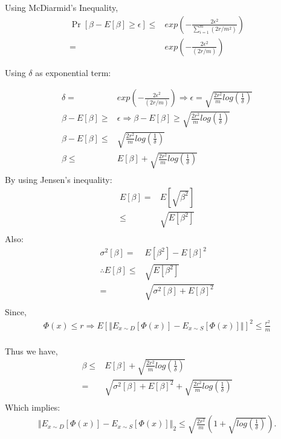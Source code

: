 \documentclass{article}
\begin{document}
\begin{description}
    Using McDiarmid's Inequality,
    \begin{align*}
      \Pr\left[\beta-E[\beta]\geq\epsilon\right] \leq & exp\left(-\frac{2\epsilon^{2}}{\sum_{i=1}^{m}\left(2r/m^{2}\right)}\right) \\
      = & exp\left(-\frac{2\epsilon^{2}}{\left(2r/m\right)}\right)
    \end{align*}

    Using $ \delta $ as exponential term:

    \begin{align*}
      \delta= & exp\left(-\frac{2\epsilon^{2}}{\left(2r/m\right)}\right)\Rightarrow\epsilon=\sqrt{\frac{2r^{2}}{m}log\left(\frac{1}{\delta}\right)}\\
      \beta-E[\beta] \geq & \epsilon\Rightarrow\beta-E[\beta]\geq\sqrt{\frac{2r^{2}}{m}log\left(\frac{1}{\delta}\right)} \\
      \beta-E[\beta] \leq & \sqrt{\frac{2r^{2}}{m}log\left(\frac{1}{\delta}\right)} \\
      \beta \leq & E[\beta]+\sqrt{\frac{2r^{2}}{m}log\left(\frac{1}{\delta}\right)} \\
    \end{align*}
    By using Jensen's inequality:
    \begin{align*}
      E[\beta]= & E\left[\sqrt{\beta^{2}}\right]\\
      \leq & \sqrt{E\left[\beta^{2}\right]} \\
    \end{align*}
    Also:
    \begin{align*}
      \sigma^{2}[\beta] = & E\left[\beta^{2}\right]-E\left[\beta\right]^{2} \\
      \therefore E[\beta] \leq & \sqrt{E\left[\beta^{2}\right]} \\ 
      = & \sqrt{\sigma^{2}[\beta]+E\left[\beta\right]^{2}}\\
    \end{align*}
    Since,
    \begin{align*}
      \Phi(x)\leq r\Rightarrow E\left[\left\Vert E_{x\sim D}\left[\Phi(x)\right]-E_{x\sim S}\left[\Phi(x)\right]\right\Vert \right]^{2}\leq\frac{r^{2}}{m} \\
    \end{align*}

    Thus we have, 
    \begin{align*}
      \beta \leq & E[\beta]+\sqrt{\frac{2r^{2}}{m}log\left(\frac{1}{\delta}\right)} \\
      = & \sqrt{\sigma^{2}[\beta]+E\left[\beta\right]^{2}}+\sqrt{\frac{2r^{2}}{m}log\left(\frac{1}{\delta}\right)}\\
    \end{align*}
    Which implies:
    \begin{align*}
      \left\Vert E_{x\sim D}\left[\Phi(x)\right]-E_{x\sim S}\left[\Phi(x)\right]\right\Vert _{2}\leq\sqrt{\frac{2r^{2}}{m}}\left(1+\sqrt{log\left(\frac{1}{\delta}\right)}\right).\\
    \end{align*}
    
\end{description}
\end{document}
